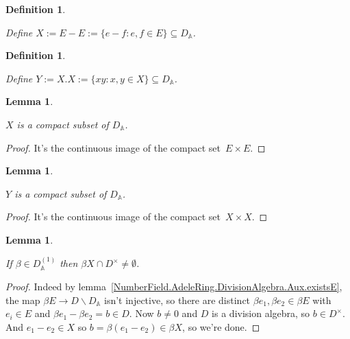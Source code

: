 \documentclass[10pt,a4paper]{article}
\newcommand{\A}{\mathbb{A}}
\newtheorem{lemma}[theorem]{Lemma}
\newtheorem{definition}[theorem]{Definition}
\newcommand{\uses}[1]{}
\newcommand{\lean}[1]{}
\newcommand{\leanok}{}
\begin{document}
\begin{definition}
  \label{NumberField.AdeleRing.DivisionAlgebra.Aux.X}
  \lean{NumberField.AdeleRing.DivisionAlgebra.Aux.X}
  \uses{NumberField.AdeleRing.DivisionAlgebra.Aux.E}
  \leanok
Define $X:=E-E:=\{e-f:e,f\in E\}\subseteq D_{\A}$.
\end{definition}

\begin{definition}
  \label{NumberField.AdeleRing.DivisionAlgebra.Aux.Y}
  \lean{NumberField.AdeleRing.DivisionAlgebra.Aux.Y}
  \uses{NumberField.AdeleRing.DivisionAlgebra.Aux.X}
  \leanok
Define $Y:=X.X:=\{xy:x,y\in X\}\subseteq D_{\A}$.
\end{definition}

\begin{lemma}
  \label{NumberField.AdeleRing.DivisionAlgebra.Aux.X_compact}
  \lean{NumberField.AdeleRing.DivisionAlgebra.Aux.X_compact}
  \uses{NumberField.AdeleRing.DivisionAlgebra.Aux.X}
  \leanok
  $X$ is a compact subset of $D_{\A}$.
\end{lemma}
\begin{proof}
  \leanok
  It's the continuous image of the compact set~$E\times E$.
\end{proof}

\begin{lemma}
  \label{NumberField.AdeleRing.DivisionAlgebra.Aux.Y_compact}
  \lean{NumberField.AdeleRing.DivisionAlgebra.Aux.Y_compact}
  \uses{NumberField.AdeleRing.DivisionAlgebra.Aux.Y}
  \leanok
  $Y$ is a compact subset of $D_{\A}$.
\end{lemma}
\begin{proof}
  \leanok
  It's the continuous image of the compact set~$X\times X$.
\end{proof}

\begin{lemma}
  \label{NumberField.AdeleRing.DivisionAlgebra.Aux.X_meets_kernel}
  \lean{NumberField.AdeleRing.DivisionAlgebra.Aux.X_meets_kernel}
  \uses{NumberField.AdeleRing.DivisionAlgebra.Aux.X, NumberField.AdeleRing.DivisionAlgebra.Aux.E}
  \leanok
  If $\beta\in D_{\A}^{(1)}$ then
$\beta X\cap D^\times\not=\emptyset$.
\end{lemma}
\begin{proof}
  \leanok
Indeed by lemma~\ref{NumberField.AdeleRing.DivisionAlgebra.Aux.existsE},
the map $\beta E\to D\backslash D_{\A}$
isn't injective, so there are distinct
$\beta e_1,\beta e_2\in \beta E$ with $e_i\in E$ and
$\beta e_1-\beta e_2=b\in D$.
Now $b\not=0$ and $D$ is a division algebra, so $b\in D^\times$.
And $e_1-e_2\in X$ so $b=\beta(e_1-e_2)\in \beta X$, so we're done.
\end{proof}
\end{document}
